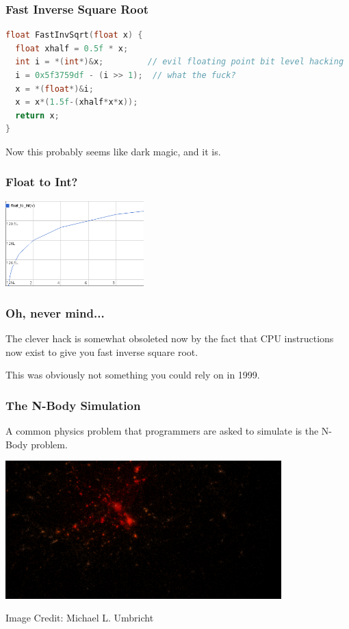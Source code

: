 \begin{frame}[fragile]
\frametitle{Fast Inverse Square Root}

\begin{lstlisting}[language=C]
float FastInvSqrt(float x) {
  float xhalf = 0.5f * x;
  int i = *(int*)&x;         // evil floating point bit level hacking
  i = 0x5f3759df - (i >> 1);  // what the fuck?
  x = *(float*)&i;
  x = x*(1.5f-(xhalf*x*x));
  return x;
}
\end{lstlisting}

 Now this probably seems like dark magic, and it is. 

\end{frame}


\begin{frame}
\frametitle{Float to Int?}

\begin{center}
	\includegraphics[width=0.4\textwidth]{images/float-to-int.png}
\end{center}



\end{frame}



\begin{frame}
\frametitle{Oh, never mind...}


The clever hack is somewhat obsoleted now by the fact that CPU instructions now exist to give you fast inverse square root. 

This was obviously not something you could rely on in 1999.

\end{frame}




\begin{frame}
\frametitle{The N-Body Simulation}

A common physics problem that programmers are asked to simulate is the N-Body problem.

\begin{center}
\includegraphics[width=0.8\textwidth]{images/Galaxy_Cluster_sim.png}
\end{center}
\hfill Image Credit: Michael L. Umbricht 


\end{frame}


